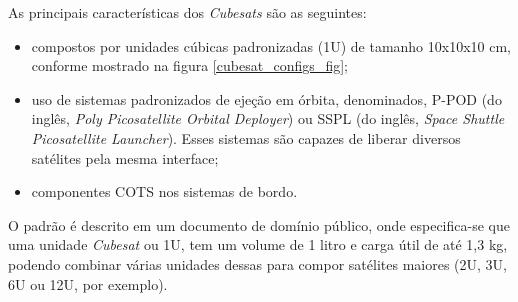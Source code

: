 As principais características dos \textit{Cubesats} são as seguintes:
\begin{itemize}
    \item compostos por unidades cúbicas padronizadas (1U) de tamanho 10x10x10 cm, conforme mostrado na figura \ref{cubesat_configs_fig};
    \item uso de sistemas padronizados de ejeção em órbita, denominados, P-POD (do inglês, \textit{Poly Picosatellite Orbital Deployer}) ou SSPL (do inglês, \textit{Space Shuttle Picosatellite Launcher}). Esses sistemas são capazes de liberar diversos satélites pela mesma interface;
    \item componentes COTS nos sistemas de bordo.
\end{itemize}

\noindent
\begin{minipage}{\linewidth}
\label{cubesat_configs_fig}
\end{minipage}

O padrão é descrito em um documento de domínio público\cite{cubesat_specs_rev13}, onde especifica-se que uma unidade \textit{Cubesat} ou 1U, tem um volume de 1 litro e carga útil de até 1,3 kg, podendo combinar várias unidades dessas para compor satélites maiores (2U, 3U, 6U ou 12U, por exemplo).

\noindent
\begin{minipage}{\linewidth}
\label{cubesat1U_dimensions_fig}
\end{minipage}

